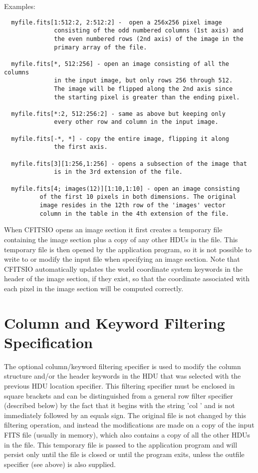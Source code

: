 \documentclass[11pt]{book}
\begin{document}
 Examples:

\begin{verbatim}
  myfile.fits[1:512:2, 2:512:2] -  open a 256x256 pixel image
              consisting of the odd numbered columns (1st axis) and
              the even numbered rows (2nd axis) of the image in the
              primary array of the file.

  myfile.fits[*, 512:256] - open an image consisting of all the columns
              in the input image, but only rows 256 through 512.
              The image will be flipped along the 2nd axis since
              the starting pixel is greater than the ending pixel.

  myfile.fits[*:2, 512:256:2] - same as above but keeping only
              every other row and column in the input image.

  myfile.fits[-*, *] - copy the entire image, flipping it along
              the first axis.

  myfile.fits[3][1:256,1:256] - opens a subsection of the image that
              is in the 3rd extension of the file.

  myfile.fits[4; images(12)][1:10,1:10] - open an image consisting
	      of the first 10 pixels in both dimensions. The original
	      image resides in the 12th row of the 'images' vector
	      column in the table in the 4th extension of the file.
\end{verbatim}

When CFITSIO opens an image section it first creates a temporary file
containing the image section plus a copy of any other HDUs in the
file.  This temporary file is then opened by the application program,
so it is not possible to write to or modify the input file when
specifying an image section.  Note that CFITSIO automatically updates
the world coordinate system keywords in the header of the image
section, if they exist, so that the coordinate associated with each
pixel in the image section will be computed correctly.


\section{Column and Keyword Filtering Specification}

The optional column/keyword filtering specifier is used to modify the
column structure and/or the header keywords in the HDU that was
selected with the previous HDU location specifier. This filtering
specifier must be enclosed in square brackets and can be distinguished
from a general row filter specifier (described below) by the fact that
it begins with the string 'col ' and is not immediately followed by an
equals sign.  The original file is not changed by this filtering
operation, and instead the modifications are made on a copy of the
input FITS file (usually in memory), which also contains a copy of all
the other HDUs in the file.  This temporary file is passed to the
application program and will persist only until the file is closed or
until the program exits, unless the outfile specifier (see above) is
also supplied.
\end{document}
